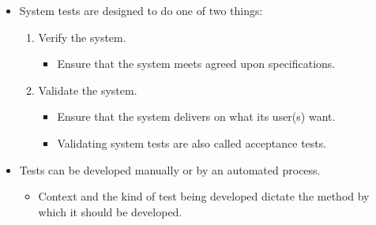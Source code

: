 \documentclass{article}
\begin{document}
\begin{itemize}
\begin{enumerate}
\begin{itemize}
			\item Create integration tests for all units at once.
			\item TLDR; shit, dumb, cringe.
		\end{itemize}
		\item The top-down approach:
		\begin{itemize}
			\item Create integration tests starting with the largest units/components first.
			\item TLDR; Mid asf.
		\end{itemize}
		\item The bottom-up approach:
		\begin{itemize}
			\item Create integration tests starting with the smallest units/components first.
			\item TLDR; based, epic.
		\end{itemize}
	\end{enumerate}
	\item System tests are designed to do one of two things:
	\begin{enumerate}
		\item Verify the system.
		\begin{itemize}
			\item Ensure that the system meets agreed upon specifications.
		\end{itemize}
		\item Validate the system.
		\begin{itemize}
			\item Ensure that the system delivers on what its user(s) want.
			\item Validating system tests are also called acceptance tests.
		\end{itemize}
	\end{enumerate}
	\item Tests can be developed manually or by an automated process.
	\begin{itemize}
		\item Context and the kind of test being developed dictate the method by which it should be developed.
	\end{itemize}
\end{itemize}

\ifdefined\iscombined
	\newpage
\else
	
\end{document}
